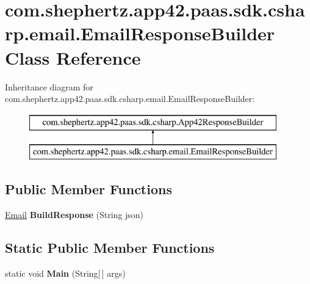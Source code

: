 \hypertarget{classcom_1_1shephertz_1_1app42_1_1paas_1_1sdk_1_1csharp_1_1email_1_1_email_response_builder}{\section{com.\+shephertz.\+app42.\+paas.\+sdk.\+csharp.\+email.\+Email\+Response\+Builder Class Reference}
\label{classcom_1_1shephertz_1_1app42_1_1paas_1_1sdk_1_1csharp_1_1email_1_1_email_response_builder}
}
Inheritance diagram for com.\+shephertz.\+app42.\+paas.\+sdk.\+csharp.\+email.\+Email\+Response\+Builder\+:\begin{figure}[H]
\begin{center}
\leavevmode
\includegraphics[height=2.000000cm]{classcom_1_1shephertz_1_1app42_1_1paas_1_1sdk_1_1csharp_1_1email_1_1_email_response_builder}
\end{center}
\end{figure}
\subsection*{Public Member Functions}
\begin{DoxyCompactItemize}
\item 
\hypertarget{classcom_1_1shephertz_1_1app42_1_1paas_1_1sdk_1_1csharp_1_1email_1_1_email_response_builder_a7c25ed932a9992c67ce8a785960b7cfc}{\hyperlink{classcom_1_1shephertz_1_1app42_1_1paas_1_1sdk_1_1csharp_1_1email_1_1_email}{Email} {\bfseries Build\+Response} (String json)}\label{classcom_1_1shephertz_1_1app42_1_1paas_1_1sdk_1_1csharp_1_1email_1_1_email_response_builder_a7c25ed932a9992c67ce8a785960b7cfc}

\end{DoxyCompactItemize}
\subsection*{Static Public Member Functions}
\begin{DoxyCompactItemize}
\item 
\hypertarget{classcom_1_1shephertz_1_1app42_1_1paas_1_1sdk_1_1csharp_1_1email_1_1_email_response_builder_ad3d3911cc8ae476eb5a2d55c22fb42a0}{static void {\bfseries Main} (String\mbox{[}$\,$\mbox{]} args)}\label{classcom_1_1shephertz_1_1app42_1_1paas_1_1sdk_1_1csharp_1_1email_1_1_email_response_builder_ad3d3911cc8ae476eb5a2d55c22fb42a0}

\end{DoxyCompactItemize}
